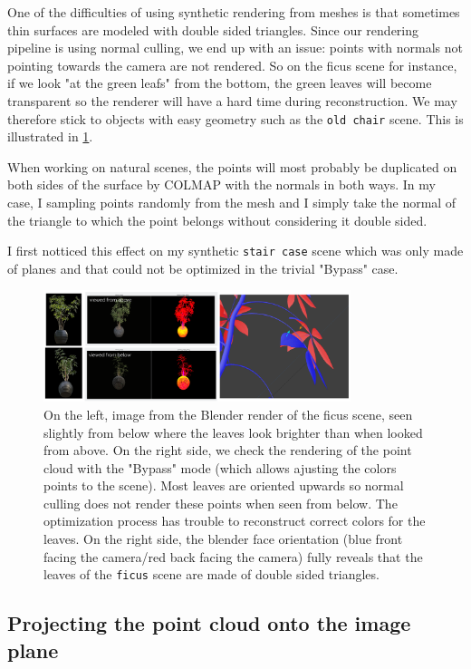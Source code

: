 One of the difficulties of using synthetic rendering from meshes is that sometimes thin surfaces are modeled with double sided triangles. Since our rendering pipeline is using normal culling, we end up with an issue: points with normals not pointing towards the camera are not rendered. So on the ficus scene for instance, if we look "at the green leafs" from the bottom, the green leaves will become transparent so the renderer will have a hard time during reconstruction. We may therefore stick to objects with easy geometry such as the \texttt{old chair} scene. This is illustrated in \cref{fig:ficus_culling_issue}.

When working on natural scenes, the points will most probably be duplicated on both sides of the surface by COLMAP with the normals in both ways. In my case, I sampling points randomly from the mesh and I simply take the normal of the triangle to which the point belongs without considering it double sided.

I first notticed this effect on my synthetic \texttt{stair case} scene which was only made of planes and that could not be optimized in the trivial "Bypass" case.

\begin{figure}
    \centering
    \includegraphics[width=0.8\textwidth]{figures/double_sided_surfaces_issues.png}
    \caption{On the left, image from the Blender render of the ficus scene, seen slightly from below where the leaves look brighter than when looked from above. On the right side, we check the rendering of the point cloud with the "Bypass" mode (which allows ajusting the colors points to the scene). Most leaves are oriented upwards so normal culling does not render these points when seen from below. The optimization process has trouble to reconstruct correct colors for the leaves. On the right side, the blender face orientation (blue front facing the camera/red back facing the camera) fully reveals that the leaves of the \texttt{ficus} scene are made of double sided triangles.}
    \label{fig:ficus_culling_issue}
\end{figure}

\subsection{Projecting the point cloud onto the image plane}
\label{sec:projecting_the_point_cloud_onto_the_image_plane}

